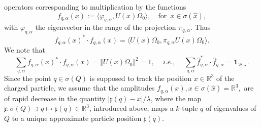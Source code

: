 \documentclass[11pt]{article}
\begin{document}
operators corresponding to multiplication by the functions
\begin{equation}\label{amplitude}
{f}_{q,\alpha}(x):= \langle \varphi_{q, \alpha}, U(x) \Omega_{0}\rangle, \quad \text{for }\,x\in \sigma(\hat{x}),
\end{equation}
with $\varphi_{q, \alpha}$ the eigenvector in the range of the projection $\pi_{q,\alpha}$. Thus
$$
{f}_{q, \alpha}(x)^{*}\cdot {f}_{q, \alpha}(x) = \langle U(x) \Omega_{0}, \pi_{q, \alpha} U(x) \Omega_{0}\rangle.
$$
We note that 
\begin{equation}\label{sumrule}
\sum_{q, \alpha} {f}_{q, \alpha}(x)^{*}\cdot {f}_{q, \alpha}(x) = \Vert U(x)\Omega_{0}\Vert^{2}= 1,\,\quad i.e., \quad \,
\sum_{q, \alpha} \widehat{f}_{q, \alpha}^{*} \cdot \widehat{f}_{q, \alpha} = \mathbf{1}_{\mathcal{H}_P}\,.
\end{equation}
Since the point $q\in \sigma(Q)$ is supposed to track the position $x\in \mathbb{R}^{3}$ of the charged particle, 
we assume that the amplitudes $f_{q, \alpha}(x), x\in \sigma(\hat{x}) = \mathbb{R}^{3},$ are of rapid decrease 
in the quantity $\vert \mathfrak{x}(q)-x \vert/\lambda$, where the map 
$\mathfrak{x}: \sigma(Q)\ni q \mapsto \mathfrak{x}(q) \in \mathbb{R}^{3}$, introduced above, 
maps a $k$-tuple $q$ of eigenvalues of $Q$ to a unique approximate particle position $\mathfrak{x}(q)$.
\end{document}
